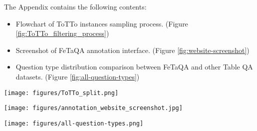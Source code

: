 \documentclass[11pt,a4paper]{article}
\newcommand{\ours}{FeTaQA\xspace}
\begin{document}
The Appendix contains the following contents:
\begin{itemize}
    \item Flowchart of ToTTo instances sampling process. (Figure \ref{fig:ToTTo_filtering_process})
    \item Screenshot of \ours annotation interface. (Figure \ref{fig:website-screenshot})
    \item Question type distribution comparison between \ours and other Table QA datasets. (Figure \ref{fig:all-question-types})
\end{itemize}

\begin{figure*}[ht]
  \centering
  \texttt{[image: figures/ToTTo\_split.png]}
  \caption{Flowchart of ToTTo filtering process}
  \label{fig:ToTTo_filtering_process}
\end{figure*}


\begin{figure*}[h]
  \centering
  \texttt{[image: figures/annotation\_website\_screenshot.jpg]}
  \caption{\ours annotation interface}
  \label{fig:website-screenshot}
\end{figure*}

\begin{figure*}[h]
  \centering
  \texttt{[image: figures/all-question-types.png]}
  \caption{Question type distribution comparison between different Table QA datasets}
  \label{fig:all-question-types}
\end{figure*}
\end{document}
